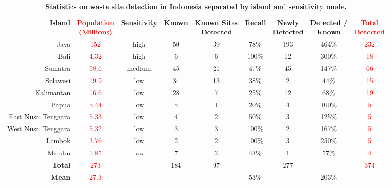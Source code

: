 \documentclass[10pt,letterpaper]{article}
\begin{document}
\begin{table}[!ht]
\begin{adjustwidth}{-2.25in}{0in}
    \caption{\bf{ Statistics on waste site detection in Indonesia separated by island and sensitivity mode. }}
    \label{table:indonesia_stats}
    \begin{tabular}{rcccccccc}
    \toprule
    \textbf{Island} & \specialcell{\textbf{\textcolor{red}{Population}}\\\textbf{\textcolor{red}{(Millions)}}} & \textbf{Sensitivity} & \textbf{Known} & \specialcell{\textbf{Known Sites}\\\textbf{Detected}} & \textbf{Recall} & \specialcell{\textbf{Newly}\\\textbf{Detected}} & \specialcell{\textbf{Detected /}\\\textbf{Known}}  & \specialcell{\textbf{\textcolor{red}{Total}}\\\textbf{\textcolor{red}{Detected}}}\\
    Java            & \textcolor{red}{152}  & high   & 50    & 39 & 78\%  & 193 & 464\% & \textcolor{red}{232}\\
    Bali            & \textcolor{red}{4.32} & high   & 6     & 6  & 100\% & 12  & 300\% & \textcolor{red}{18} \\
    Sumatra         & \textcolor{red}{58.6} & medium & 45    & 21 & 47\%  & 45  & 147\% & \textcolor{red}{66} \\
    Sulawesi        & \textcolor{red}{19.9} & low    & 34    & 13 & 38\%  & 2   & 44\%  & \textcolor{red}{15} \\
    Kalimantan      & \textcolor{red}{16.6} & low    & 28    & 7  & 25\%  & 12  & 68\%  & \textcolor{red}{19} \\
    Papua           & \textcolor{red}{5.44} & low    & 5     & 1  & 20\%  & 4   & 100\% & \textcolor{red}{5}  \\
    East Nusa\
    Tenggara        & \textcolor{red}{5.33} & low    & 4     & 2  & 50\%  & 3   & 125\% & \textcolor{red}{5}  \\
    West Nusa\
    Tenggara        & \textcolor{red}{5.32} & low    & 3     & 3  & 100\% & 2   & 167\% & \textcolor{red}{5}  \\
    Lombok          & \textcolor{red}{3.76} & low    & 2     & 2  & 100\% & 3   & 250\% & \textcolor{red}{5}  \\
    Maluku          & \textcolor{red}{1.85} & low    & 7     & 3  & 43\%  & 1   & 57\%  & \textcolor{red}{4}  \\
    \midrule
    \textbf{Total}  & \textcolor{red}{273}  & -      & 184   & 97 & -     & 277 & -     & \textcolor{red}{374}\\
    \textbf{Mean}   & \textcolor{red}{27.3} & -      & -     & -  & 53\%  & -   & 203\% & \textcolor{red}{-}  \\
    \bottomrule
    \end{tabular}
    \end{adjustwidth}
\end{table}
\end{document}

